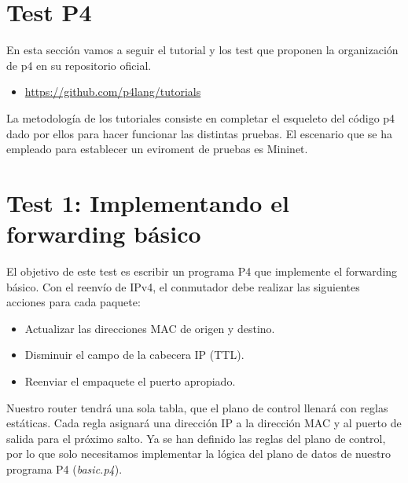 \section{Test P4}
En esta sección vamos a seguir el tutorial y los test que proponen la organización de p4 en su repositorio oficial.
\begin{itemize}
    \item \url{https://github.com/p4lang/tutorials}
\end{itemize}
La metodología de los tutoriales consiste en completar el esqueleto del código p4 dado por ellos para hacer funcionar las distintas pruebas. El escenario que se ha empleado para establecer un eviroment de pruebas es Mininet.

\section{Test 1: Implementando el forwarding básico}

El objetivo de este test es escribir un programa P4 que implemente el forwarding básico. Con el reenvío de IPv4, el conmutador debe realizar las siguientes acciones para cada paquete:
\begin{itemize}
    \item Actualizar las direcciones MAC de origen y destino.
    \item Disminuir el campo de la cabecera IP (TTL).
    \item Reenviar el empaquete el puerto apropiado.
\end{itemize}

Nuestro router tendrá una sola tabla, que el plano de control llenará con reglas estáticas. Cada regla asignará una dirección IP a la dirección MAC y al puerto de salida para el próximo salto. Ya se han definido las reglas del plano de control, por lo que solo necesitamos implementar la lógica del plano de datos de nuestro programa P4 (\textit{basic.p4}).

